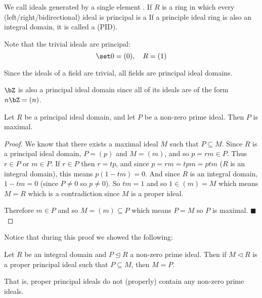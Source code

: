 \documentclass[10pt]{article}
\let\ideal=\trianglelefteq
\let\pideal=\triangleleft
\def\qed{\hskip1cm\hbox{}\hfill$\blacksquare$}
\begin{document}
\begin{defn*}

    We call ideals generated by a single element .
    If $R$ is a ring in which every (left/right/bidirectional) ideal is principal is a  
    If a principle ideal ring is also an integral domain, it is called a  (PID).

\end{defn*}

Note that the trivial ideals are principal:
\[ \set 0 = (0),\quad R = (1) \]

\begin{exam*}

    \benum
        \item Since the ideals of a field are trivial, all fields are principal ideal domains.
        \item $\bZ$ is also a principal ideal domain since all of its ideals are of the form $n\bZ=(n)$.
    \eenum

\end{exam*}

\begin{prop*}

    Let $R$ be a principal ideal domain, and let $P$ be a non-zero prime ideal.
    Then $P$ is maximal.

\end{prop*}

\begin{proof}

    We know that there exists a maximal ideal $M$ such that $P\subseteq M$.
    Since $R$ is a principal ideal domain, $P=(p)$ and $M=(m)$, and so $p=rm\in P$.
    Thus $r\in P$ or $m\in P$.
    If $r\in P$ then $r=tp$, and since $p=rm=tpm=ptm$ ($R$ is an integral domain), this means $p(1-tm)=0$.
    And since $R$ is an integral domain, $1-tm=0$ (since $P\neq0$ so $p\neq0$).
    So $tm=1$ and so $1\in(m)=M$ which means $M=R$ which is a contradiction since $M$ is a proper ideal.

    Therefore $m\in P$ and so $M=(m)\subseteq P$ which means $P=M$ so $P$ is maximal.
    \qed

\end{proof}

Notice that during this proof we showed the following:

\begin{prop*}

    Let $R$ be an integral domain and $P\ideal R$ a non-zero prime ideal.
    Then if $M\pideal R$ is a proper principal ideal such that $P\subseteq M$, then $M=P$.

    That is, proper principal ideals do not (properly) contain any non-zero prime ideals.

\end{prop*}
\end{document}
